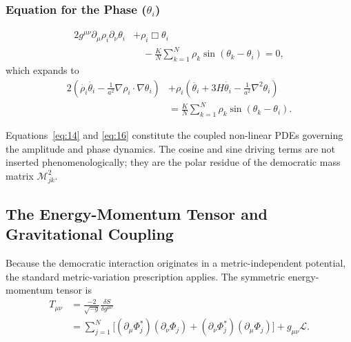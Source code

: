 \subsubsection*{Equation for the Phase ($\theta_i$)}
\begin{equation}
\begin{aligned}
2g^{\mu\nu}\partial_\mu\rho_i\partial_\nu\theta_i &+ \rho_i\Box\theta_i \\
&\quad- \frac{K}{N}\sum_{k=1}^N\rho_k\sin(\theta_k-\theta_i) = 0 ,
\end{aligned}
\end{equation}
which expands to
\begin{equation}
{
\begin{aligned}
2\!\left(\dot{\rho_i}\dot{\theta_i} - \frac{1}{a^2}\nabla\rho_i\!\cdot\!\nabla\theta_i\right)
&+ \rho_i\!\left(\ddot{\theta_i} + 3H\dot{\theta_i} - \frac{1}{a^2}\nabla^2\theta_i\right) \\
&= \frac{K}{N}\sum_{k=1}^N\rho_k\sin(\theta_k-\theta_i) .
\end{aligned}
} \label{eq:16}
\end{equation}

Equations~\eqref{eq:14} and \eqref{eq:16} constitute the coupled non-linear PDEs governing the amplitude and phase dynamics. The cosine and sine driving terms are not inserted phenomenologically; they are the polar residue of the democratic mass matrix $\mathcal{M}^2_{jk}$.

\subsection{The Energy-Momentum Tensor and Gravitational Coupling}
\label{subsec:emt}

Because the democratic interaction originates in a metric-independent potential, the standard metric-variation prescription applies. The symmetric energy-momentum tensor is
\begin{equation}
\begin{aligned}
T_{\mu\nu} &= \frac{-2}{\sqrt{-g}}\frac{\delta S}{\delta g^{\mu\nu}} \\
&= \sum_{j=1}^N\big[(\partial_\mu\Phi_j^*)(\partial_\nu\Phi_j)
+ (\partial_\nu\Phi_j^*)(\partial_\mu\Phi_j)\big]
+ g_{\mu\nu}\mathcal{L} .
\end{aligned}
\end{equation}

